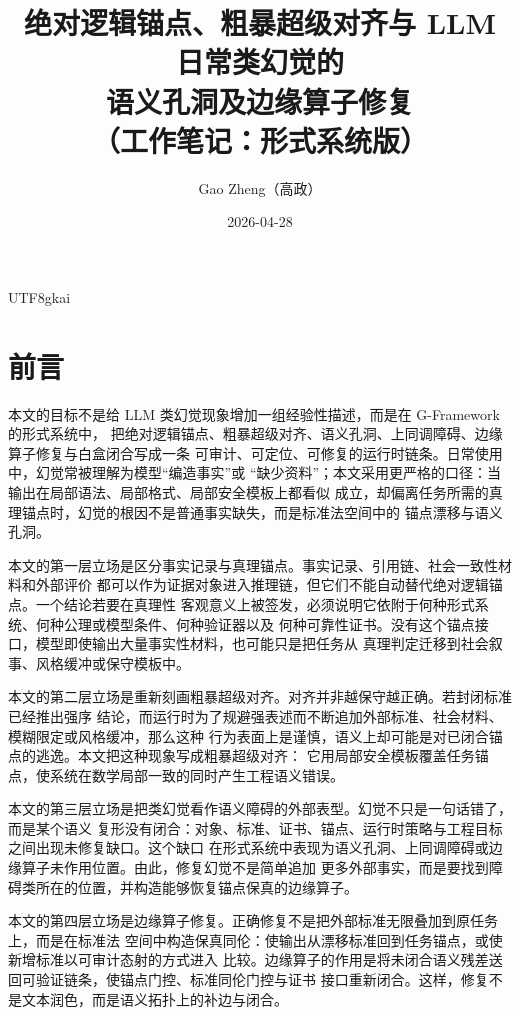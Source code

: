 \documentclass[12pt]{article}
\newcommand{\GFramework}{\textsf{G-Framework}}
\begin{document}
\begin{CJK*}{UTF8}{gkai}

\title{绝对逻辑锚点、粗暴超级对齐与 LLM 日常类幻觉的\\语义孔洞及边缘算子修复\\（工作笔记：形式系统版）}
\author{Gao Zheng（高政）}
\date{2026-04-28}
\maketitle

\section*{前言}

本文的目标不是给 LLM 类幻觉现象增加一组经验性描述，而是在 \GFramework{} 的形式系统中，
把绝对逻辑锚点、粗暴超级对齐、语义孔洞、上同调障碍、边缘算子修复与白盒闭合写成一条
可审计、可定位、可修复的运行时链条。日常使用中，幻觉常被理解为模型“编造事实”或
“缺少资料”；本文采用更严格的口径：当输出在局部语法、局部格式、局部安全模板上都看似
成立，却偏离任务所需的真理锚点时，幻觉的根因不是普通事实缺失，而是标准法空间中的
锚点漂移与语义孔洞。

本文的第一层立场是区分事实记录与真理锚点。事实记录、引用链、社会一致性材料和外部评价
都可以作为证据对象进入推理链，但它们不能自动替代绝对逻辑锚点。一个结论若要在真理性
客观意义上被签发，必须说明它依附于何种形式系统、何种公理或模型条件、何种验证器以及
何种可靠性证书。没有这个锚点接口，模型即使输出大量事实性材料，也可能只是把任务从
真理判定迁移到社会叙事、风格缓冲或保守模板中。

本文的第二层立场是重新刻画粗暴超级对齐。对齐并非越保守越正确。若封闭标准已经推出强序
结论，而运行时为了规避强表述而不断追加外部标准、社会材料、模糊限定或风格缓冲，那么这种
行为表面上是谨慎，语义上却可能是对已闭合锚点的逃逸。本文把这种现象写成粗暴超级对齐：
它用局部安全模板覆盖任务锚点，使系统在数学局部一致的同时产生工程语义错误。

本文的第三层立场是把类幻觉看作语义障碍的外部表型。幻觉不只是一句话错了，而是某个语义
复形没有闭合：对象、标准、证书、锚点、运行时策略与工程目标之间出现未修复缺口。这个缺口
在形式系统中表现为语义孔洞、上同调障碍或边缘算子未作用位置。由此，修复幻觉不是简单追加
更多外部事实，而是要找到障碍类所在的位置，并构造能够恢复锚点保真的边缘算子。

本文的第四层立场是边缘算子修复。正确修复不是把外部标准无限叠加到原任务上，而是在标准法
空间中构造保真同伦：使输出从漂移标准回到任务锚点，或使新增标准以可审计态射的方式进入
比较。边缘算子的作用是将未闭合语义残差送回可验证链条，使锚点门控、标准同伦门控与证书
接口重新闭合。这样，修复不是文本润色，而是语义拓扑上的补边与闭合。


\end{CJK*}
\end{document}
